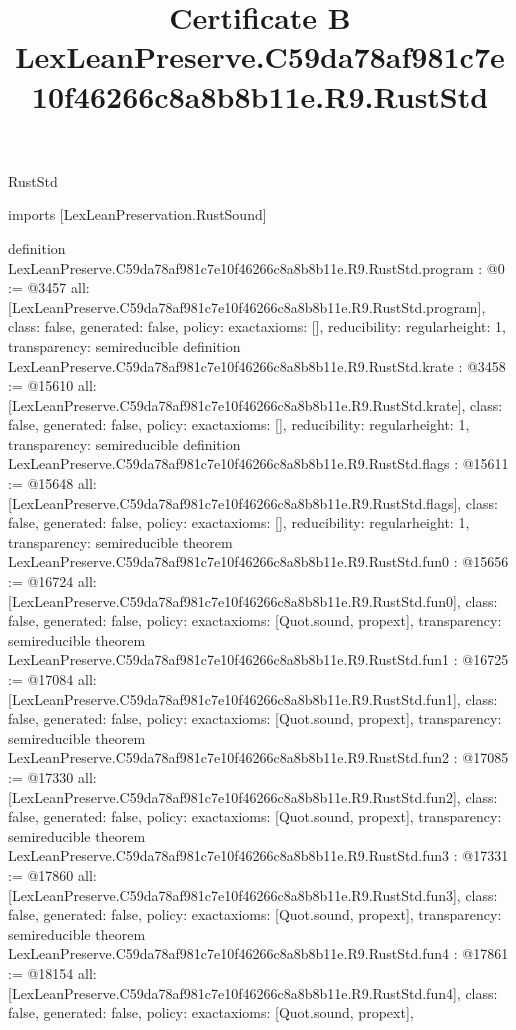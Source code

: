 \begin{lexlean}{RustStd}
\title{Certificate B LexLeanPreserve.C59da78af981c7e10f46266c8a8b8b11e.R9.RustStd}
\begin{coremodule}
imports [LexLeanPreservation.RustSound]

definition LexLeanPreserve.C59da78af981c7e10f46266c8a8b8b11e.R9.RustStd.program : @0 := @3457 {
  all: [LexLeanPreserve.C59da78af981c7e10f46266c8a8b8b11e.R9.RustStd.program],
  class: false,
  generated: false,
  policy: exact{axioms: []},
  reducibility: regular{height: 1},
  transparency: semireducible
}
definition LexLeanPreserve.C59da78af981c7e10f46266c8a8b8b11e.R9.RustStd.krate : @3458 := @15610 {
  all: [LexLeanPreserve.C59da78af981c7e10f46266c8a8b8b11e.R9.RustStd.krate],
  class: false,
  generated: false,
  policy: exact{axioms: []},
  reducibility: regular{height: 1},
  transparency: semireducible
}
definition LexLeanPreserve.C59da78af981c7e10f46266c8a8b8b11e.R9.RustStd.flags : @15611 := @15648 {
  all: [LexLeanPreserve.C59da78af981c7e10f46266c8a8b8b11e.R9.RustStd.flags],
  class: false,
  generated: false,
  policy: exact{axioms: []},
  reducibility: regular{height: 1},
  transparency: semireducible
}
theorem LexLeanPreserve.C59da78af981c7e10f46266c8a8b8b11e.R9.RustStd.fun0 : @15656 := @16724 {
  all: [LexLeanPreserve.C59da78af981c7e10f46266c8a8b8b11e.R9.RustStd.fun0],
  class: false,
  generated: false,
  policy: exact{axioms: [Quot.sound, propext]},
  transparency: semireducible
}
theorem LexLeanPreserve.C59da78af981c7e10f46266c8a8b8b11e.R9.RustStd.fun1 : @16725 := @17084 {
  all: [LexLeanPreserve.C59da78af981c7e10f46266c8a8b8b11e.R9.RustStd.fun1],
  class: false,
  generated: false,
  policy: exact{axioms: [Quot.sound, propext]},
  transparency: semireducible
}
theorem LexLeanPreserve.C59da78af981c7e10f46266c8a8b8b11e.R9.RustStd.fun2 : @17085 := @17330 {
  all: [LexLeanPreserve.C59da78af981c7e10f46266c8a8b8b11e.R9.RustStd.fun2],
  class: false,
  generated: false,
  policy: exact{axioms: [Quot.sound, propext]},
  transparency: semireducible
}
theorem LexLeanPreserve.C59da78af981c7e10f46266c8a8b8b11e.R9.RustStd.fun3 : @17331 := @17860 {
  all: [LexLeanPreserve.C59da78af981c7e10f46266c8a8b8b11e.R9.RustStd.fun3],
  class: false,
  generated: false,
  policy: exact{axioms: [Quot.sound, propext]},
  transparency: semireducible
}
theorem LexLeanPreserve.C59da78af981c7e10f46266c8a8b8b11e.R9.RustStd.fun4 : @17861 := @18154 {
  all: [LexLeanPreserve.C59da78af981c7e10f46266c8a8b8b11e.R9.RustStd.fun4],
  class: false,
  generated: false,
  policy: exact{axioms: [Quot.sound, propext]},
}
\end{coremodule}
\end{lexlean}
